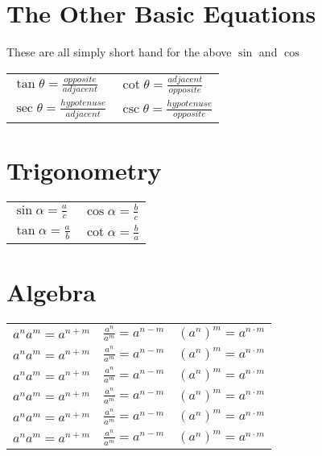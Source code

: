 \documentclass[letter,9pt]{extarticle}
\begin{document}
\begin{multicols*}{2}
\section{The Other Basic Equations}
These are all simply short hand for the above $\sin$ and $\cos$


\begin{tabular}{ll}
$\tan\theta = \frac{opposite}{adjacent}$ & $\cot\theta = \frac{adjacent}{opposite}$ \\[2ex]
$\sec\theta = \frac{hypotenuse}{adjacent}$ & $\csc\theta = \frac{hypotenuse}{opposite}$\\[1ex]
\end{tabular}

\section{Trigonometry}


\medskip

\begin{tabular}{ll}
$\sin\alpha = \frac{a}{c}$ & $\cos\alpha = \frac{b}{c}$ \\[1ex]
$\tan\alpha = \frac{a}{b}$ & $\cot\alpha = \frac{b}{a}$ \\
\end{tabular}


\section{Algebra}

\begin{tabular}{lll}
$a^n a^m = a^{n+m}$ & $\frac{a^n}{a^m} = a^{n-m}$ & $(a^n)^m = a^{n \cdot m}$\\
$a^n a^m = a^{n+m}$ & $\frac{a^n}{a^m} = a^{n-m}$ & $(a^n)^m = a^{n \cdot m}$\\
$a^n a^m = a^{n+m}$ & $\frac{a^n}{a^m} = a^{n-m}$ & $(a^n)^m = a^{n \cdot m}$\\
$a^n a^m = a^{n+m}$ & $\frac{a^n}{a^m} = a^{n-m}$ & $(a^n)^m = a^{n \cdot m}$\\
$a^n a^m = a^{n+m}$ & $\frac{a^n}{a^m} = a^{n-m}$ & $(a^n)^m = a^{n \cdot m}$\\
$a^n a^m = a^{n+m}$ & $\frac{a^n}{a^m} = a^{n-m}$ & $(a^n)^m = a^{n \cdot m}$
\end{tabular}



\end{multicols*}
\end{document}
